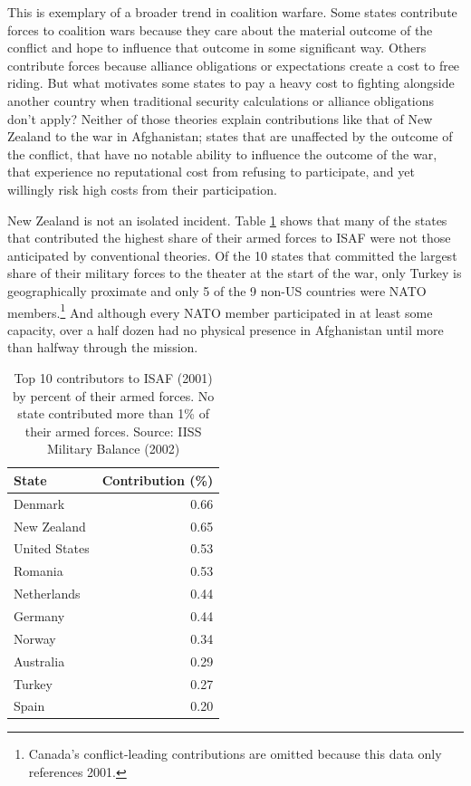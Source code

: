 \documentclass[12pt,letterpaper]{article}
\begin{document}
	This is exemplary of a broader trend in coalition warfare. Some states contribute forces to coalition wars because they care about the material outcome of the conflict and hope to influence that outcome in some significant way. Others contribute forces because alliance obligations or expectations create a cost to free riding. But what motivates some states to pay a heavy cost to fighting alongside another country when traditional security calculations or alliance obligations don't apply? Neither of those theories explain contributions like that of New Zealand to the war in Afghanistan; states that are unaffected by the outcome of the conflict, that have no notable ability to influence the outcome of the war, that experience no reputational cost from refusing to participate, and yet willingly risk high costs from their participation.
	
	New Zealand is not an isolated incident. Table \ref{table:2001_top} shows that many of the states that contributed the highest share of their armed forces to ISAF were not those anticipated by conventional theories. Of the 10 states that committed the largest share of their military forces to the theater at the start of the war, only Turkey is geographically proximate and only 5 of the 9 non-US countries were NATO members.\footnote{Canada's conflict-leading contributions are omitted because this data only references 2001.} And although every NATO member participated in at least some capacity, over a half dozen had no physical presence in Afghanistan until more than halfway through the mission.

	\begin{table}[ht]
		\centering
		\begin{tabular}{|lr|}
			\hline
			\textbf{State} & \textbf{Contribution (\%)} \\
			\hline
			Denmark & 0.66 \\
			New Zealand & 0.65 \\
			United States & 0.53 \\
			Romania & 0.53 \\
			Netherlands & 0.44 \\
			Germany & 0.44 \\
			Norway & 0.34 \\
			Australia & 0.29 \\
			Turkey & 0.27 \\
			Spain & 0.20 \\
			\hline
		\end{tabular}
	\caption{Top 10 contributors to ISAF (2001) by percent of their armed forces. No state contributed more than 1\% of their armed forces. Source: IISS Military Balance (2002)}
	\label{table:2001_top}
	\end{table}
\end{document}
